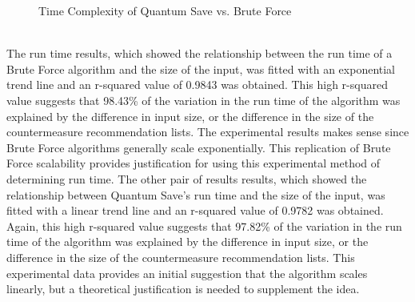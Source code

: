 \begin{figure}[ht]%
    \centering
    \qquad
    \caption{Time Complexity of Quantum Save vs. Brute Force}%
    \label{fig:example}%
\end{figure}
 \\

The run time results, which showed the relationship between the run time of a Brute Force algorithm and the size of the input, was fitted with an exponential trend line and an r-squared value of 0.9843 was obtained. This high r-squared value suggests that 98.43\% of the variation in the run time of the algorithm was explained by the difference in input size, or the difference in the size of the countermeasure recommendation lists. The experimental results makes sense since Brute Force algorithms generally scale exponentially. This replication of Brute Force scalability provides justification for using this experimental method of determining run time. The other pair of results results, which showed the relationship between Quantum Save's run time and the size of the input, was fitted with a linear trend line and an r-squared value of 0.9782 was obtained. Again, this high r-squared value suggests that 97.82\% of the variation in the run time of the algorithm was explained by the difference in input size, or the difference in the size of the countermeasure recommendation lists. This experimental data provides an initial suggestion that the algorithm scales linearly, but a theoretical justification is needed to supplement the idea. 

